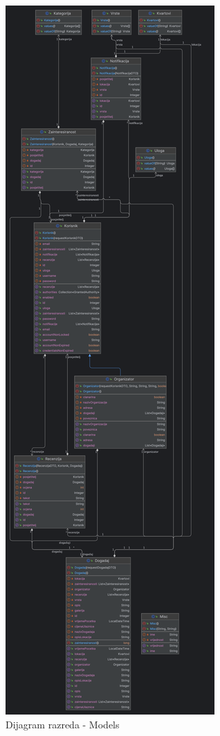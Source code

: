 			
			\begin{figure}[H]
				\includegraphics[scale=0.1]{dijagramiKlasa/models.png} %
				\centering
				\caption{Dijagram razreda - Models}
				\label{fig:promjene}
			\end{figure}
			
